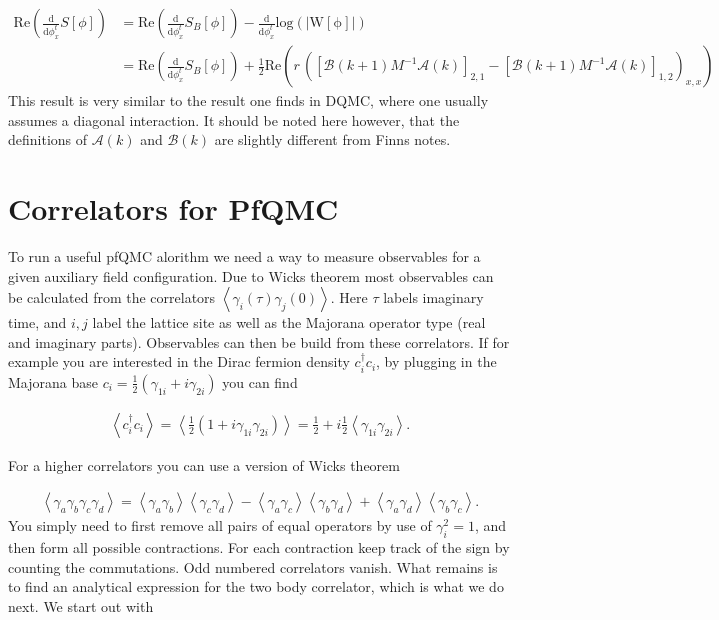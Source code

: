 \documentclass{article}
\begin{document}
\begin{align}
	\mathrm{Re} \left(\frac{\mathrm{d} }{\mathrm{d}\phi_{x}^{t} } S[\phi] \right) &= \mathrm{Re} \left(\frac{\mathrm{d} }{\mathrm{d}\phi_{x}^{t} }  S_B[\phi] \right) - \frac{\mathrm{d} }{\mathrm{d}\phi_{x}^{t} }\mathrm{log\left(|W[\phi]|\right) }  \nonumber \\
	&= \mathrm{Re} \left(\frac{\mathrm{d} }{\mathrm{d}\phi_{x}^{t} }  S_B[\phi] \right) + \frac{1}{2} \mathrm{Re}\left(  r\,  \left(\left[\mathcal{B}\left(k+1\right)M^{-1} \mathcal{A}\left(k\right)\right]_{2,1} - \left[\mathcal{B}\left(k+1\right)M^{-1} \mathcal{A}\left(k\right)\right]_{1,2}  \right)_{x,x}  \right)
\end{align}
This result is very similar to the result one finds in DQMC, where one usually assumes a diagonal interaction. It should be noted here however, that the definitions of $\mathcal{A}(k)$ and $\mathcal{B}(k)$ are slightly different from Finns notes.


\section{Correlators for PfQMC}

To run a useful pfQMC alorithm we need a way to measure observables for a given auxiliary field configuration. Due to Wicks theorem most observables can be calculated from the correlators $\left< \gamma_{i}(\tau) \gamma_j(0)\right>$. Here $\tau$ labels imaginary time, and $i,j$ label the lattice site as well as the Majorana operator type (real and imaginary parts). Observables can then be build from these correlators. If for example you are interested in the Dirac fermion density $c_{i}^{\dagger}c_{i}$, by plugging in the Majorana base $c_{i}=\frac{1}{2}\left(\gamma_{1i}  + i \gamma_{2i} \right)$ you can find

\begin{align}
	\left<c_{i}^{\dagger}c_{i}\right> = \left< \frac{1}{2}\left(1 + i\gamma_{1i}\gamma_{2i}  \right)  \right> = \frac{1}{2} + i\frac{1}{2}  \left< \gamma_{1i}\gamma_{2i} \right>.
\end{align}  


For a higher correlators you can use a version of Wicks theorem

\begin{align}
	\left< \gamma_{a}\gamma_{b}\gamma_{c}\gamma_{d}\right> = \left< \gamma_{a}\gamma_{b}\right>\left< \gamma_{c}\gamma_{d}  \right> - \left< \gamma_{a}\gamma_{c}\right>\left< \gamma_{b}\gamma_{d}  \right> + \left< \gamma_{a}\gamma_{d}\right>\left< \gamma_{b}\gamma_{c}  \right>. 
\end{align}
You simply need to first remove all pairs of equal operators by use of $\gamma_i^{2} = 1$, and then form all possible contractions. For each contraction keep track of the sign by counting the commutations. Odd numbered correlators vanish.  What remains is to find an analytical expression for the two body correlator, which is what we do next. We start out with
\end{document}

